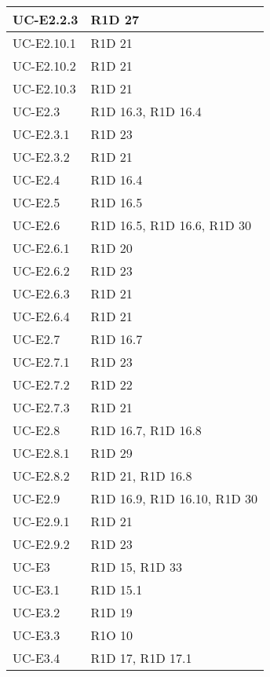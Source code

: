 \begin{center}
\begin{longtable}{ |  p{5cm} | p{5cm} |}
    UC-E2.2.3 & R1D 27 \\ \hline
    UC-E2.10.1 & R1D 21 \\ \hline
    UC-E2.10.2 & R1D 21 \\ \hline
    UC-E2.10.3 & R1D 21 \\ \hline
    UC-E2.3 & R1D 16.3, R1D 16.4 \\ \hline
    UC-E2.3.1 & R1D 23 \\ \hline
    UC-E2.3.2 & R1D 21 \\ \hline
    UC-E2.4 & R1D 16.4 \\ \hline
    UC-E2.5 & R1D 16.5 \\ \hline
    UC-E2.6 & R1D 16.5, R1D 16.6, R1D 30 \\ \hline
    UC-E2.6.1 & R1D 20 \\ \hline
    UC-E2.6.2 & R1D 23 \\ \hline
    UC-E2.6.3 & R1D 21 \\ \hline
    UC-E2.6.4 & R1D 21 \\ \hline
    UC-E2.7 & R1D 16.7 \\ \hline
    UC-E2.7.1 & R1D 23 \\ \hline
    UC-E2.7.2 & R1D 22 \\ \hline
    UC-E2.7.3 & R1D 21 \\ \hline
    UC-E2.8 & R1D 16.7, R1D 16.8 \\ \hline
    UC-E2.8.1 & R1D 29 \\ \hline
    UC-E2.8.2 & R1D 21, R1D 16.8 \\ \hline
    UC-E2.9 & R1D 16.9, R1D 16.10, R1D 30 \\ \hline 
    UC-E2.9.1 & R1D 21 \\ \hline
    UC-E2.9.2 & R1D 23 \\ \hline
    UC-E3 & R1D 15, R1D 33 \\ \hline
    UC-E3.1 & R1D 15.1 \\ \hline
    UC-E3.2 & R1D 19 \\ \hline
    UC-E3.3 & R1O 10 \\ \hline
    UC-E3.4 & R1D 17, R1D 17.1 \\ \hline
    \end{longtable}
  \egroup
\end{center}
